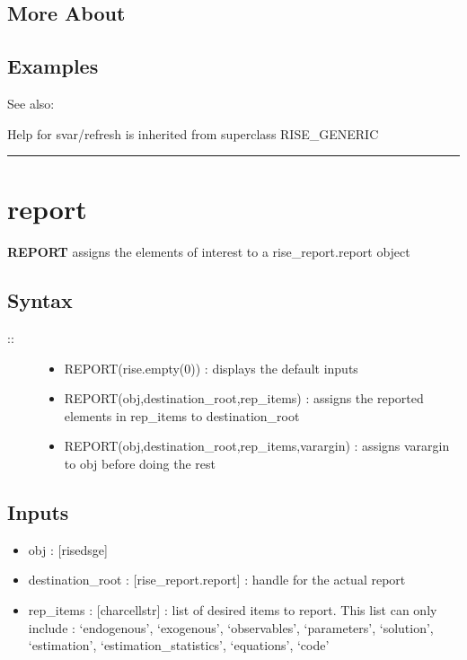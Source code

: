 \documentclass[letterpaper,10pt,english]{sphinxmanual}
\begin{document}
\subsection{More About}
\label{classes/models/@svar/svar:id112}

\subsection{Examples}
\label{classes/models/@svar/svar:id113}
See also:

Help for svar/refresh is inherited from superclass RISE\_GENERIC


\bigskip\hrule{}\bigskip



\section{report}
\label{classes/models/@svar/svar:report}\label{classes/models/@svar/svar:id114}
\textbf{REPORT} assigns the elements of interest to a rise\_report.report object


\subsection{Syntax}
\label{classes/models/@svar/svar:id115}\begin{description}
\item[{::}] \leavevmode\begin{itemize}
\item {} 
REPORT(rise.empty(0)) : displays the default inputs

\item {} 
REPORT(obj,destination\_root,rep\_items) : assigns the reported
elements in rep\_items to destination\_root

\item {} 
REPORT(obj,destination\_root,rep\_items,varargin) : assigns varargin to
obj before doing the rest

\end{itemize}

\end{description}


\subsection{Inputs}
\label{classes/models/@svar/svar:id116}\begin{itemize}
\item {} 
obj : {[}rise\textbar{}dsge{]}

\item {} 
destination\_root : {[}rise\_report.report{]} : handle for the actual report

\item {} 
rep\_items : {[}char\textbar{}cellstr{]} : list of desired items to report. This list
can only include : `endogenous', `exogenous', `observables',
`parameters', `solution', `estimation', `estimation\_statistics',
`equations', `code'

\end{itemize}
\end{document}

